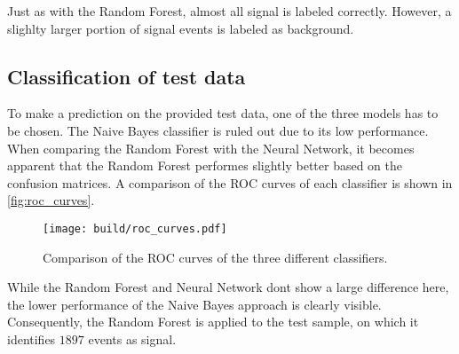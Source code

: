 Just as with the Random Forest, almost all signal is labeled correctly.
However, a slighlty larger portion of signal events is labeled as background.

\subsection{Classification of test data}

To make a prediction on the provided test data, one of the three models has
to be chosen. The Naive Bayes classifier is ruled out due to its low performance.
When comparing the Random Forest with the Neural Network, it becomes apparent that
the Random Forest performes slightly better based on the confusion matrices.
A comparison of the ROC curves of each classifier is shown in \autoref{fig:roc_curves}.

\begin{figure}[H]
  \centering
  \texttt{[image: build/roc\_curves.pdf]}
  \caption{Comparison of the ROC curves of the three different classifiers.}
  \label{fig:roc_curves}
\end{figure}

While the Random Forest and Neural Network dont show a large difference here, the
lower performance of the Naive Bayes approach is clearly visible.
Consequently, the Random Forest is applied to the test sample, on which it
identifies $1897$ events as signal.